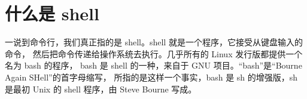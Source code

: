 \renewcommand\chapterillustration{cherry-tomatos}
\chapter{什么是 shell}

一说到命令行，我们真正指的是 shell。shell 就是一个程序，它接受从键盘输入的命令， 然后把命令传递给操作系统去执行。几乎所有的 Linux 发行版都提供一个名为 bash 的程序， bash 是 shell 的一种，来自于 GNU 项目。“bash”是“Bourne Again SHell”的首字母缩写， 所指的是这样一个事实，bash 是 sh 的增强版，sh 是最初 Unix 的 shell 程序，由 Steve Bourne 写成。












